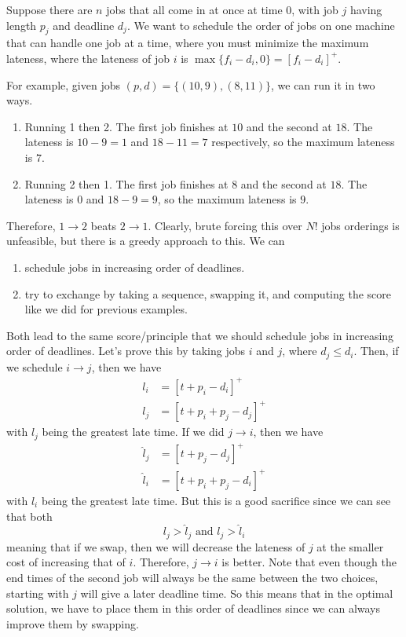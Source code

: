   \begin{example}
    \label{ex:minimizing-max-lateness}
    Suppose there are $n$ jobs that all come in at once at time $0$, with job $j$ having length $p_j$ and deadline $d_j$. We want to schedule the order of jobs on one machine that can handle one job at a time, where you must minimize the maximum lateness, where the lateness of job $i$ is $\max\{f_i - d_i, 0\} = [f_i - d_i]^+$. 

    For example, given jobs $(p, d) = \{(10, 9), (8, 11)\}$, we can run it in two ways. 
    \begin{enumerate}
      \item Running 1 then 2. The first job finishes at $10$ and the second at $18$. The lateness is $10 - 9 = 1$ and $18 - 11 = 7$ respectively, so the maximum lateness is $7$. 
      \item Running 2 then 1. The first job finishes at $8$ and the second at $18$. The lateness is $0$ and $18 - 9 = 9$, so the maximum lateness is $9$.  
    \end{enumerate}
    Therefore, $1 \rightarrow 2$ beats $2 \rightarrow 1$. Clearly, brute forcing this over $N!$ jobs orderings is unfeasible, but there is a greedy approach to this. We can 
    \begin{enumerate}
      \item schedule jobs in increasing order of deadlines. 
      \item try to exchange by taking a sequence, swapping it, and computing the score like we did for previous examples. 
    \end{enumerate}
    Both lead to the same score/principle that we should schedule jobs in increasing order of deadlines. Let's prove this by taking jobs $i$ and $j$, where $d_j \leq d_i$. Then, if we schedule $i \rightarrow j$, then we have 
    \begin{align}
      l_i & = [t + p_i - d_i]^+ \\
      l_j & = [t + p_i + p_j - d_j]^+ 
    \end{align}
    with $l_j$ being the greatest late time. If we did $j \rightarrow i$, then we have 
    \begin{align}
      \hat{l}_j & = [t + p_j - d_j]^+ \\
      \hat{l}_i & = [t + p_i + p_j - d_i]^+ 
    \end{align}
    with $\hat{l}_i$ being the greatest late time. But this is a good sacrifice since we can see that both 
    \begin{equation}
      l_j > \hat{l}_j \text{ and } l_j > \hat{l}_i
    \end{equation}
    meaning that if we swap, then we will decrease the lateness of $j$ at the smaller cost of increasing that of $i$. Therefore, $j \rightarrow i$ is better. Note that even though the end times of the second job will always be the same between the two choices, starting with $j$ will give a later deadline time. So this means that in the optimal solution, we have to place them in this order of deadlines since we can always improve them by swapping. 
  \end{example}

